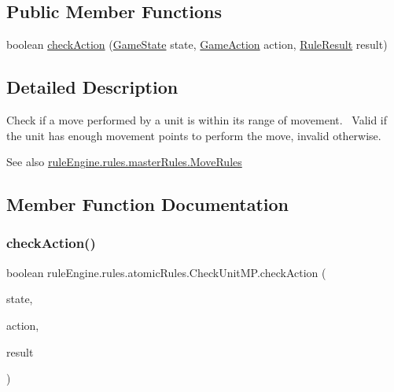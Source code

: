 \subsection*{Public Member Functions}
\begin{DoxyCompactItemize}
\item 
boolean \mbox{\hyperlink{classrule_engine_1_1rules_1_1atomic_rules_1_1_check_unit_m_p_ab5e04bb0355061dabd2ade65bf65d635}{check\+Action}} (\mbox{\hyperlink{classgame_1_1game_state_1_1_game_state}{Game\+State}} state, \mbox{\hyperlink{classrule_engine_1_1_game_action}{Game\+Action}} action, \mbox{\hyperlink{classrule_engine_1_1_rule_result}{Rule\+Result}} result)
\end{DoxyCompactItemize}


\subsection{Detailed Description}
Check if a move performed by a unit is within its range of movement.~\newline
 Valid if the unit has enough movement points to perform the move, invalid otherwise.

\begin{DoxySeeAlso}{See also}
\mbox{\hyperlink{classrule_engine_1_1rules_1_1master_rules_1_1_move_rules}{rule\+Engine.\+rules.\+master\+Rules.\+Move\+Rules}} 
\end{DoxySeeAlso}


\subsection{Member Function Documentation}
\mbox{\label{classrule_engine_1_1rules_1_1atomic_rules_1_1_check_unit_m_p_ab5e04bb0355061dabd2ade65bf65d635}} 
\subsubsection{\texorpdfstring{check\+Action()}{checkAction()}}
{\footnotesize\ttfamily boolean rule\+Engine.\+rules.\+atomic\+Rules.\+Check\+Unit\+M\+P.\+check\+Action (\begin{DoxyParamCaption}\item[{\mbox{\hyperlink{classgame_1_1game_state_1_1_game_state}{Game\+State}}}]{state,  }\item[{\mbox{\hyperlink{classrule_engine_1_1_game_action}{Game\+Action}}}]{action,  }\item[{\mbox{\hyperlink{classrule_engine_1_1_rule_result}{Rule\+Result}}}]{result }\end{DoxyParamCaption})\hspace{0.3cm}{\ttfamily [inline]}}



